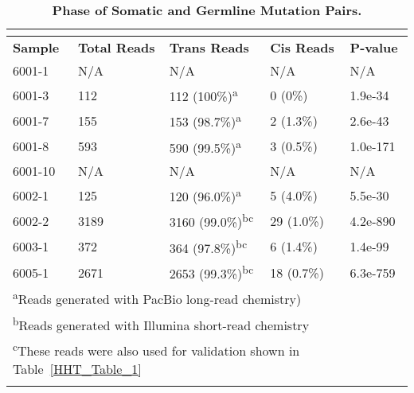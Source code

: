 \begin{table}[]
\footnotesize
\renewcommand{\arraystretch}{1.4} 
\centering
\caption[Phase of Somatic and Germline Mutation Pairs.]{\textbf{Phase of Somatic and Germline Mutation Pairs.}}

\begin{tabularx}{0.75\linewidth}{lllll}
\multicolumn{5}{l}{} \\
\toprule
\textbf{Sample} & \textbf{Total Reads} & \textbf{Trans Reads} & \textbf{Cis Reads} & \textbf{P-value} \\
\midrule
6001-1	& N/A	& N/A						& N/A		& N/A \\\hline
6001-3	& 112	& 112 (100\%)\textsuperscript{a}	& 0 (0\%)		& 1.9e-34 \\\hline
6001-7	& 155	& 153 (98.7\%)\textsuperscript{a}	& 2 (1.3\%)	& 2.6e-43 \\\hline
6001-8	& 593	& 590 (99.5\%)\textsuperscript{a}	& 3 (0.5\%)	& 1.0e-171 \\\hline
6001-10	& N/A	& N/A						& N/A		& N/A \\\hline
6002-1	& 125	& 120 (96.0\%)\textsuperscript{a}	& 5 (4.0\%)	& 5.5e-30 \\\hline
6002-2	& 3189	& 3160 (99.0\%)\textsuperscript{bc}	& 29 (1.0\%)	& 4.2e-890 \\\hline
6003-1	& 372	& 364 (97.8\%)\textsuperscript{bc}	& 6 (1.4\%)	& 1.4e-99 \\\hline
6005-1	& 2671	& 2653 (99.3\%)\textsuperscript{bc}	& 18 (0.7\%)	& 6.3e-759 \\

\bottomrule
\multicolumn{5}{l}{\textsuperscript{a}Reads generated with PacBio long-read chemistry)} \\
\multicolumn{5}{l}{\textsuperscript{b}Reads generated with Illumina short-read chemistry} \\
\multicolumn{5}{l}{\textsuperscript{c}These reads were also used for validation shown in Table~\ref{HHT_Table_1}} \\
\label{HHT_Table_2}
\end{tabularx}

\end{table}



